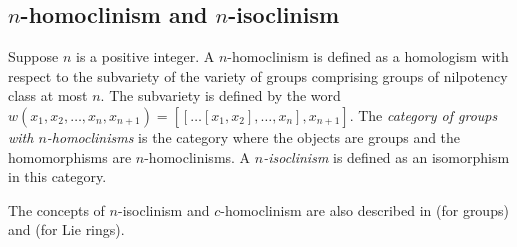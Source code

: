 

\subsection{$n$-homoclinism and $n$-isoclinism}

Suppose $n$ is a positive integer. A $n$-homoclinism is defined as a
homologism with respect to the subvariety of the variety of groups
comprising groups of nilpotency class at most $n$. The subvariety is
defined by the word $w(x_1,x_2,\dots,x_n,x_{n+1}) = [[ \dots
    [x_1,x_2],\dots,x_n],x_{n+1}]$. The {\em category of groups with
  $n$-homoclinisms} is the category where the objects are groups and
the homomorphisms are $n$-homoclinisms. A {\em $n$-isoclinism} is
defined as an isomorphism in this category.

The concepts of $n$-isoclinism and $c$-homoclinism are also
described in \cite{Hekster} (for groups) and \cite{Moghaddametal} (for
Lie rings).










 


